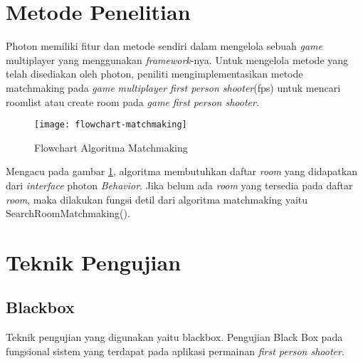 \newpage
\section{Metode Penelitian}
\noindent

Photon memiliki fitur dan metode sendiri dalam mengelola sebuah \textit{game} multiplayer yang menggunakan \textit{framework}-nya. Untuk mengelola metode yang telah disediakan oleh photon, peniliti mengimplementasikan metode matchmaking pada \textit{game} \textit{multiplayer first person shooter}(fps) untuk mencari roomlist atau create room pada \textit{game} \textit{first person shooter}.
        \begin{figure}[h]
         \centering
         \texttt{[image: flowchart-matchmaking]}
         \caption{Flowchart Algoritma Matchmaking}
         \label{fig:algoritmamatmaching}
         \end{figure}

Mengacu pada gambar \ref{fig:algoritmamatmaching}, algoritma membutuhkan daftar \textit{room} yang didapatkan dari \textit{interface} photon \textit{Behavior}. Jika belum ada \textit{room} yang tersedia pada daftar \textit{room}, maka dilakukan fungsi detil dari algoritma matchmaking yaitu SearchRoomMatchmaking(). 


        \section{Teknik Pengujian}
        \subsection{Blackbox}
Teknik pengujian yang digunakan yaitu blackbox. Pengujian Black Box pada fungsional sistem yang terdapat pada aplikasi permainan \textit{first person shooter}.

